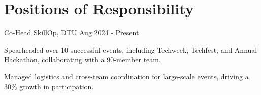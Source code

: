 \documentclass[a4paper,10pt]{article}
\begin{document}
\section{Positions of Responsibility}


\resumeSubheading
{Co-Head}
{}
{SkillOp, DTU}
{Aug 2024 - Present}

\resumeItemListStart
\item Spearheaded over 10 successful events, including Techweek, Techfest, and Annual Hackathon, collaborating with a 90-member team.
\item Managed logistics and cross-team coordination for large-scale events, driving a 30\% growth in participation.
\resumeItemListEnd




\vfill
{}
\end{document}
